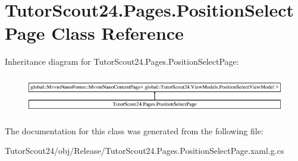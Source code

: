 \hypertarget{class_tutor_scout24_1_1_pages_1_1_position_select_page}{}\section{Tutor\+Scout24.\+Pages.\+Position\+Select\+Page Class Reference}
\label{class_tutor_scout24_1_1_pages_1_1_position_select_page}
Inheritance diagram for Tutor\+Scout24.\+Pages.\+Position\+Select\+Page\+:\begin{figure}[H]
\begin{center}
\leavevmode
\includegraphics[height=1.699545cm]{class_tutor_scout24_1_1_pages_1_1_position_select_page}
\end{center}
\end{figure}


The documentation for this class was generated from the following file\+:\begin{DoxyCompactItemize}
\item 
Tutor\+Scout24/obj/\+Release/Tutor\+Scout24.\+Pages.\+Position\+Select\+Page.\+xaml.\+g.\+cs\end{DoxyCompactItemize}
